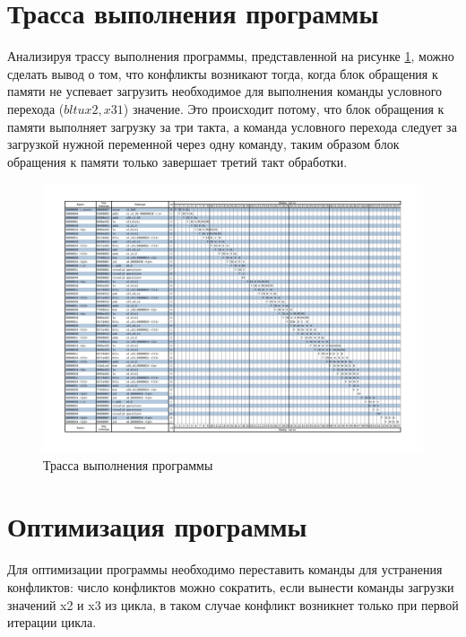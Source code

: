 \section{Трасса выполнения программы}

Анализируя трассу выполнения программы, представленной на рисунке \ref{img:pipeline-18}, можно сделать вывод о том, что конфликты возникают тогда, когда блок обращения к памяти не
успевает загрузить необходимое для выполнения команды условного перехода ($bltu x2,x31$) значение. Это происходит потому, что блок обращения к памяти выполняет загрузку за три такта, а команда условного перехода следует за загрузкой нужной переменной через одну команду, таким образом блок обращения к памяти только завершает третий такт обработки.

\begin{figure}[H]
	\begin{center}
		\includegraphics[scale=0.4]{img/pipeline_18.png}
	\end{center}
	\captionsetup{justification=centering}
	\caption{Трасса выполнения программы}
	\label{img:pipeline-18}
\end{figure}

\section{Оптимизация программы}

Для оптимизации программы необходимо переставить команды для устранения конфликтов: число конфликтов можно сократить, если вынести команды загрузки значений x2 и x3 из цикла, в таком случае конфликт возникнет только при первой итерации цикла.

